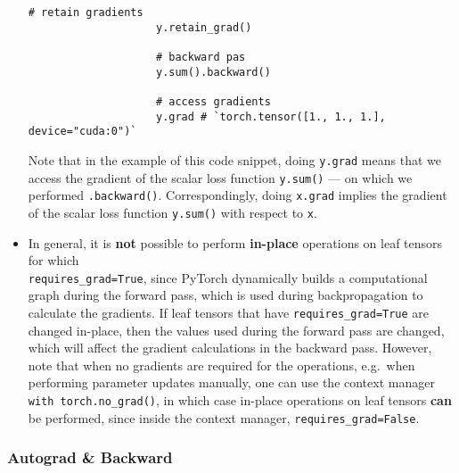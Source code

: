 \documentclass[12pt, a4paper]{article}
\numberwithin{equation}{section}
\theoremstyle{definition}
\theoremstyle{definition}
\begin{document}
\begin{itemize}
\begin{lstlisting}[style=mystylepython, label=alg:retain_grad, xleftmargin=\parindent]
					# retain gradients
					y.retain_grad()

					# backward pas
					y.sum().backward()
					
					# access gradients
					y.grad # `torch.tensor([1., 1., 1.], device="cuda:0")`
				\end{lstlisting}
				
				Note that in the example of this code snippet, doing \texttt{y.grad} means that we access the gradient of the scalar loss function \texttt{y.sum()} --- on which we performed \texttt{.backward()}. Correspondingly, doing \texttt{x.grad} implies the gradient of the scalar loss function \texttt{y.sum()} with respect to \texttt{x}.
				
				\item In general, it is \textbf{not} possible to perform \textbf{in-place} operations on leaf tensors for which \\ \texttt{requires\_grad=True}, since
				PyTorch dynamically builds a computational graph during the forward pass, which is used during backpropagation to calculate the gradients. If leaf tensors that have \texttt{requires\_grad=True} are changed in-place, then the values used during the forward pass are changed, which will affect the gradient calculations in the backward pass. However, note that when no gradients are required for the operations, e.g.~when performing parameter updates manually, one can use the context manager \texttt{with torch.no\_grad()}, in which case in-place operations on leaf tensors \textbf{can} be performed, since inside the context manager, \texttt{requires\_grad=False}.
				
			\end{itemize}		
		
		\subsubsection{Autograd \& Backward}
		
\end{document}
